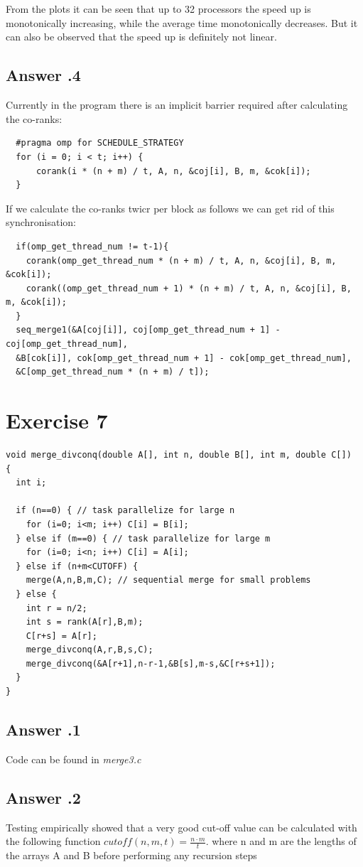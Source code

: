\documentclass[a4paper,%
11pt,%
DIV=12,
headsepline,%
headings=normal,
]{scrartcl}
\newcounter{curex}
\newcommand{\exercise}[1]{\section*{Exercise #1}\setcounter{curex}{#1}}
\newcommand{\answer}[1]{\subsection*{Answer \arabic{curex}.#1}}
\begin{document}
\\
\\
From the plots it can be seen that up to 32 processors the speed up is monotonically increasing, while the average time monotonically decreases.
But it can also be observed that the speed up is definitely not linear.
\newpage
\answer{4}
Currently in the program there is an implicit barrier required after calculating the co-ranks:\\
  \begin{minipage}[t]{1.0\linewidth}
\begin{lstlisting}
  #pragma omp for SCHEDULE_STRATEGY
  for (i = 0; i < t; i++) {
      corank(i * (n + m) / t, A, n, &coj[i], B, m, &cok[i]);
  }
  \end{lstlisting}
\end{minipage}
If we calculate the co-ranks twicr per block as follows we can get rid of this synchronisation:
  \begin{minipage}[t]{1.0\linewidth}
\begin{lstlisting}
  if(omp_get_thread_num != t-1){
    corank(omp_get_thread_num * (n + m) / t, A, n, &coj[i], B, m, &cok[i]);
    corank((omp_get_thread_num + 1) * (n + m) / t, A, n, &coj[i], B, m, &cok[i]);
  }
  seq_merge1(&A[coj[i]], coj[omp_get_thread_num + 1] - coj[omp_get_thread_num], 
  &B[cok[i]], cok[omp_get_thread_num + 1] - cok[omp_get_thread_num], 
  &C[omp_get_thread_num * (n + m) / t]);
  \end{lstlisting}
\end{minipage}

\exercise{7}

\begin{minipage}[t]{1.0\linewidth}
\begin{lstlisting}
void merge_divconq(double A[], int n, double B[], int m, double C[])
{
  int i;

  if (n==0) { // task parallelize for large n
    for (i=0; i<m; i++) C[i] = B[i];
  } else if (m==0) { // task parallelize for large m
    for (i=0; i<n; i++) C[i] = A[i];
  } else if (n+m<CUTOFF) {
    merge(A,n,B,m,C); // sequential merge for small problems
  } else {
    int r = n/2;
    int s = rank(A[r],B,m);
    C[r+s] = A[r];
    merge_divconq(A,r,B,s,C);
    merge_divconq(&A[r+1],n-r-1,&B[s],m-s,&C[r+s+1]);
  }
}
\end{lstlisting}
\end{minipage}

\answer{1}
Code can be found in \textit{merge3.c}
\answer{2}
Testing empirically showed that a very good cut-off value can be calculated with the following function $cutoff(n,m,t) = \frac{n \cdot m}{t}$.
where n and m are the lengths of the arrays A and B before performing any recursion steps
\end{document}
